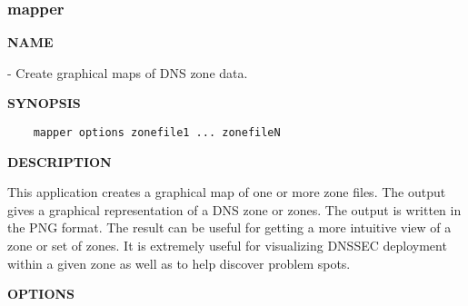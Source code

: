 \clearpage

\subsubsection{\bf mapper}

{\bf NAME}

 - Create graphical maps of DNS zone data.

{\bf SYNOPSIS}

\begin{verbatim}
    mapper options zonefile1 ... zonefileN
\end{verbatim}

{\bf DESCRIPTION}

This application creates a graphical map of one or more zone files.  The
output gives a graphical representation of a DNS zone or zones.  The output
is written in the PNG format.  The result can be useful for getting a more
intuitive view of a zone or set of zones.  It is extremely useful for
visualizing DNSSEC deployment within a given zone as well as to help discover
problem spots.

{\bf OPTIONS}

